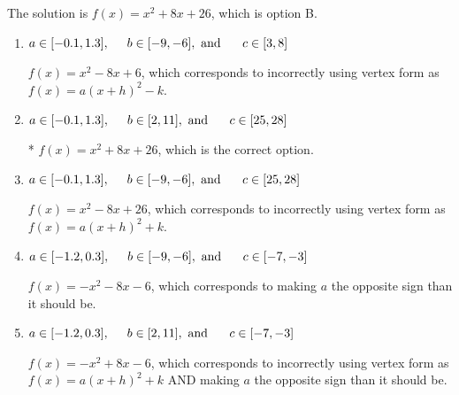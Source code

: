 \documentclass{extbook}[14pt]
\begin{document}
\begin{enumerate}
{The solution is \( f(x) = x^{2} +8 x + 26 \), which is option B.\begin{enumerate}[label=\Alph*.]
\item \( a \in [-0.1, 1.3], \hspace*{5mm} b \in [-9, -6], \text{ and } \hspace*{5mm} c \in [3, 8] \)

$f(x)=x^{2} -8 x + 6$, which corresponds to incorrectly using vertex form as $f(x) = a(x+h)^2 - k$.
\item \( a \in [-0.1, 1.3], \hspace*{5mm} b \in [2, 11], \text{ and } \hspace*{5mm} c \in [25, 28] \)

* $f(x)=x^{2} +8 x + 26$, which is the correct option.
\item \( a \in [-0.1, 1.3], \hspace*{5mm} b \in [-9, -6], \text{ and } \hspace*{5mm} c \in [25, 28] \)

$f(x)=x^{2} -8 x + 26$, which corresponds to incorrectly using vertex form as $f(x) = a(x+h)^2+k$.
\item \( a \in [-1.2, 0.3], \hspace*{5mm} b \in [-9, -6], \text{ and } \hspace*{5mm} c \in [-7, -3] \)

$f(x)=-x^{2} -8 x -6$, which corresponds to making $a$ the opposite sign than it should be.
\item \( a \in [-1.2, 0.3], \hspace*{5mm} b \in [2, 11], \text{ and } \hspace*{5mm} c \in [-7, -3] \)

$f(x)=-x^{2} +8 x -6$, which corresponds to incorrectly using vertex form as $f(x) = a(x+h)^2+k$ AND making $a$ the opposite sign than it should be.
\end{enumerate}

}
\end{enumerate}
\end{document}
